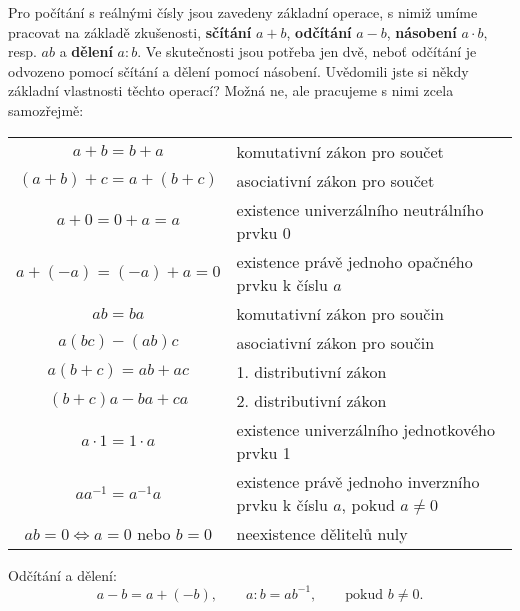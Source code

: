       Pro počítání s reálnými čísly jsou zavedeny základní operace, s nimiž umíme pracovat na
      základě zkušenosti, \textbf{sčítání} \(a + b\), \textbf{odčítání} \(a - b\), 
      \textbf{násobení} \(a \cdot b\), resp. \(ab\) a \textbf{dělení} \(a : b\). Ve skutečnosti 
      jsou potřeba jen dvě, neboť odčítání je odvozeno pomocí sčítání a dělení pomocí násobení. 
      Uvědomili jste si někdy základní vlastnosti těchto operací? Možná ne, ale pracujeme s nimi 
      zcela samozřejmě:
      \begin{table}[ht!]
        \centering
        \begin{tabular}{c | L{6cm}}
        \toprule
          \(a + b = b + a\)            & komutativní zákon pro součet  \\ %
          \((a + b) + c = a + (b +c)\) & asociativní zákon pro součet  \\
          \(a + 0 = 0 + a = a\)        & existence univerzálního neutrálního prvku \num{0}  \\
          \(a + (-a) = (-a) + a = 0\)  & existence právě jednoho opačného prvku k číslu \(a\)   \\ 
          \(ab = ba\)                  & komutativní zákon pro součin \\
          \(a(bc) - (ab)c\)            & asociativní zákon pro součin \\
          \(a(b + c) = ab + ac\)       & 1. distributivní zákon  \\
          \((b+ c)a - ba + ca\)        & 2. distributivní zákon \\
          \(a \cdot 1 = 1 \cdot a\)    & existence univerzálního jednotkového prvku 1 \\
          \(aa^{-1} = a^{-1}a\)        & existence právě jednoho inverzního prvku k číslu \(a\),  
                                         pokud \(a\neq 0\)\\
          \(ab = 0 \Leftrightarrow a = 0\) nebo \(b = 0\) & neexistence dělitelů nuly \\
         \bottomrule
        \end{tabular}
      \end{table}
      Odčítání a dělení:
      \begin{equation*}
        a - b = a + (-b),\qquad a:b = ab^{-1}, \qquad\text{pokud } b\neq0.
      \end{equation*}
      

